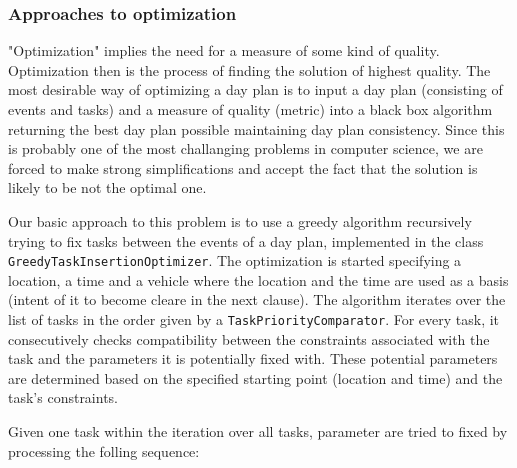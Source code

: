 \subsubsection{Approaches to optimization}
 
"Optimization" implies the need for a measure of some kind of quality. Optimization then is the process of finding the solution of highest quality. The most desirable way of optimizing a day plan is to input a day plan (consisting of events and tasks) and a measure of quality (metric) into a black box algorithm returning the best day plan possible maintaining day plan consistency. Since this is probably one of the most challanging problems in computer science, we are forced to make strong simplifications and accept the fact that the solution is likely to be not the optimal one.\newline

Our basic approach to this problem is to use a greedy algorithm recursively trying to fix tasks between the events of a day plan, implemented in the class \texttt{GreedyTaskInsertionOptimizer}. The optimization is started specifying a location, a time and a vehicle where the location and the time are used as a basis (intent of it to become cleare in the next clause). The algorithm iterates over the list of tasks in the order given by a \texttt{TaskPriorityComparator}. For every task, it consecutively checks compatibility between the constraints associated with the task and the parameters it is potentially fixed with. These potential parameters are determined based on the specified starting point (location and time) and the task's constraints.\newline

Given one task within the iteration over all tasks, parameter are tried to fixed by processing the folling sequence:

